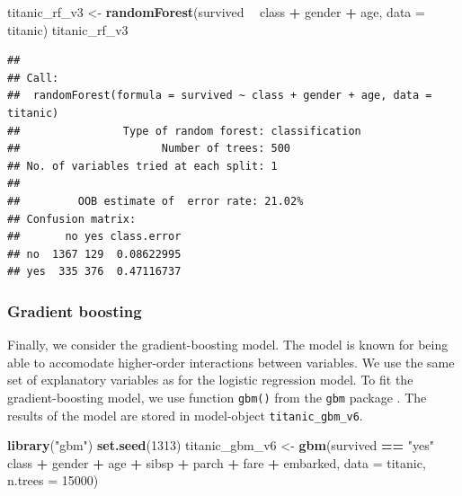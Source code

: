 \documentclass[12pt,]{krantz}
\newenvironment{Shaded}{\begin{snugshade}}{\end{snugshade}}
\newcommand{\DataTypeTok}[1]{\textcolor[rgb]{0.13,0.29,0.53}{#1}}
\newcommand{\DecValTok}[1]{\textcolor[rgb]{0.00,0.00,0.81}{#1}}
\newcommand{\KeywordTok}[1]{\textcolor[rgb]{0.13,0.29,0.53}{\textbf{#1}}}
\newcommand{\NormalTok}[1]{#1}
\newcommand{\OperatorTok}[1]{\textcolor[rgb]{0.81,0.36,0.00}{\textbf{#1}}}
\newcommand{\StringTok}[1]{\textcolor[rgb]{0.31,0.60,0.02}{#1}}
\theoremstyle{definition}
\theoremstyle{definition}
\theoremstyle{definition}
\theoremstyle{remark}
\begin{document}
\begin{Shaded}
\begin{Highlighting}[]
\NormalTok{titanic_rf_v3 <-}\StringTok{ }\KeywordTok{randomForest}\NormalTok{(survived }\OperatorTok{~}\StringTok{ }\NormalTok{class }\OperatorTok{+}\StringTok{ }\NormalTok{gender }\OperatorTok{+}\StringTok{ }\NormalTok{age, }\DataTypeTok{data =}\NormalTok{ titanic)}
\NormalTok{titanic_rf_v3}
\end{Highlighting}
\end{Shaded}

\begin{verbatim}
## 
## Call:
##  randomForest(formula = survived ~ class + gender + age, data = titanic) 
##                Type of random forest: classification
##                      Number of trees: 500
## No. of variables tried at each split: 1
## 
##         OOB estimate of  error rate: 21.02%
## Confusion matrix:
##       no yes class.error
## no  1367 129  0.08622995
## yes  335 376  0.47116737
\end{verbatim}

\hypertarget{model-titanic-gbm}{%
\subsubsection{Gradient boosting}\label{model-titanic-gbm}}

Finally, we consider the gradient-boosting model.
\citep{Friedman00greedyfunction} The model is known for being able to
accomodate higher-order interactions between variables. We use the same
set of explanatory variables as for the logistic regression model. To
fit the gradient-boosting model, we use function \texttt{gbm()} from the
\texttt{gbm} package \citep{gbm}. The results of the model are stored in
model-object \texttt{titanic\_gbm\_v6}.

\begin{Shaded}
\begin{Highlighting}[]
\KeywordTok{library}\NormalTok{(}\StringTok{"gbm"}\NormalTok{)}
\KeywordTok{set.seed}\NormalTok{(}\DecValTok{1313}\NormalTok{)}
\NormalTok{titanic_gbm_v6 <-}\StringTok{ }\KeywordTok{gbm}\NormalTok{(survived }\OperatorTok{==}\StringTok{ "yes"} \OperatorTok{~}\StringTok{ }\NormalTok{class }\OperatorTok{+}\StringTok{ }\NormalTok{gender }\OperatorTok{+}\StringTok{ }\NormalTok{age }\OperatorTok{+}\StringTok{ }\NormalTok{sibsp }\OperatorTok{+}\StringTok{ }\NormalTok{parch }\OperatorTok{+}\StringTok{ }\NormalTok{fare }\OperatorTok{+}\StringTok{ }\NormalTok{embarked, }
                      \DataTypeTok{data =}\NormalTok{ titanic, }\DataTypeTok{n.trees =} \DecValTok{15000}\NormalTok{)}
\end{Highlighting}
\end{Shaded}
\end{document}
